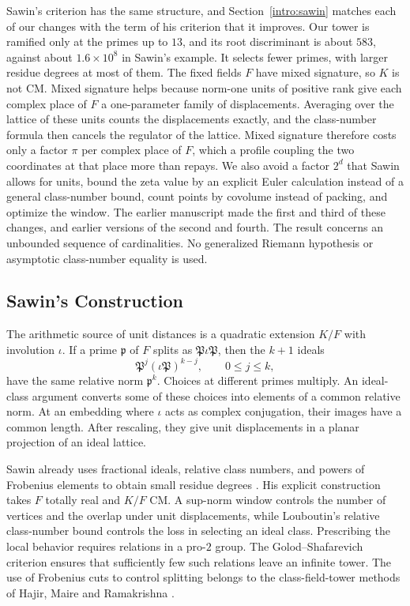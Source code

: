 Sawin's criterion has the same structure, and
Section~\ref{intro:sawin} matches each of our changes with the term of
his criterion that it improves. Our tower is ramified only at the
primes up to $13$, and its root discriminant is about $583$, against
about $1.6\times10^8$ in Sawin's example. It selects fewer primes, with
larger residue degrees at most of them. The fixed fields $F$ have mixed
signature, so $K$ is not CM. Mixed signature helps because norm-one units of
positive rank give each complex place of $F$ a one-parameter family of
displacements. Averaging over the lattice of these units counts the
displacements exactly, and the class-number formula then cancels the
regulator of the lattice. Mixed signature therefore costs only a factor
$\pi$ per complex place of $F$, which a profile coupling the two
coordinates at that place more than repays. We also avoid a factor
$2^d$ that Sawin allows for units, bound the zeta value by an explicit
Euler calculation instead of a general class-number bound, count points
by covolume instead of packing, and optimize the window. The earlier
manuscript \cite{NaslundLegacy2026} made the first and third of these
changes, and earlier versions of the second and fourth. The result concerns an
unbounded sequence of cardinalities. No generalized Riemann hypothesis
or asymptotic class-number equality is used.

\subsection{Sawin's Construction}

The arithmetic source of unit distances is a quadratic extension
$K/F$ with involution $\iota$. If a prime $\mathfrak p$ of $F$ splits as
$\mathfrak P\iota\mathfrak P$, then the $k+1$ ideals
\[
 \mathfrak P^j(\iota\mathfrak P)^{k-j},\qquad 0\le j\le k,
\]
have the same relative norm $\mathfrak p^k$. Choices at different primes
multiply. An ideal-class argument converts some of these choices into
elements of a common relative norm. At an embedding where $\iota$
acts as complex conjugation, their images have a common length.
After rescaling, they give unit displacements in a planar projection
of an ideal lattice.

Sawin already uses fractional ideals, relative class numbers, and
powers of Frobenius elements to obtain small residue degrees
\cite{Sawin2026}. His explicit construction takes $F$ totally real and
$K/F$ CM. A sup-norm window controls the number of vertices and the
overlap under unit displacements, while Louboutin's relative
class-number bound \cite{Louboutin2000} controls the loss in selecting
an ideal class. Prescribing the local behavior requires relations in
a pro-$2$ group. The Golod--Shafarevich criterion
\cite{GolodShafarevich} ensures that sufficiently few such relations
leave an infinite tower. The use of Frobenius cuts to control splitting
belongs to the class-field-tower methods of Hajir, Maire and Ramakrishna
\cite{HajirMaireRamakrishna2021Cutting}.

